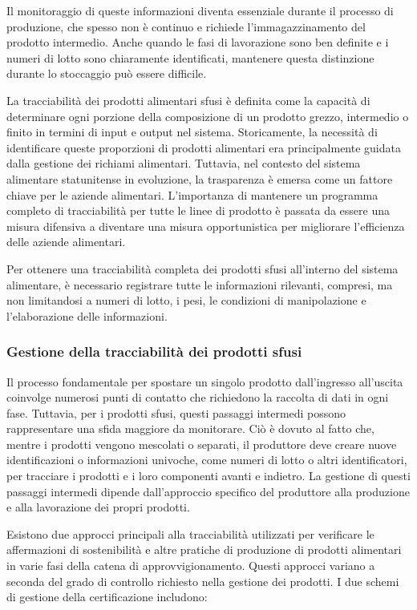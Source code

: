 Il monitoraggio di queste informazioni diventa essenziale durante il processo di produzione, che spesso non è continuo e richiede l'immagazzinamento del prodotto intermedio. Anche quando le fasi di lavorazione sono ben definite e i numeri di lotto sono chiaramente identificati, mantenere questa distinzione durante lo stoccaggio può essere difficile.

La tracciabilità dei prodotti alimentari sfusi è definita come la capacità di determinare ogni porzione della composizione di un prodotto grezzo, intermedio o finito in termini di input e output nel sistema. Storicamente, la necessità di identificare queste proporzioni di prodotti alimentari era principalmente guidata dalla gestione dei richiami alimentari. Tuttavia, nel contesto del sistema alimentare statunitense in evoluzione, la trasparenza è emersa come un fattore chiave per le aziende alimentari. L'importanza di mantenere un programma completo di tracciabilità per tutte le linee di prodotto è passata da essere una misura difensiva a diventare una misura opportunistica per migliorare l'efficienza delle aziende alimentari.

Per ottenere una tracciabilità completa dei prodotti sfusi all'interno del sistema alimentare, è necessario registrare tutte le informazioni rilevanti, compresi, ma non limitandosi a numeri di lotto, i pesi, le condizioni di manipolazione e l'elaborazione delle informazioni.

\subsubsection{Gestione della tracciabilità dei prodotti sfusi}

Il processo fondamentale per spostare un singolo prodotto dall'ingresso all'uscita coinvolge numerosi punti di contatto che richiedono la raccolta di dati in ogni fase. Tuttavia, per i prodotti sfusi, questi passaggi intermedi possono rappresentare una sfida maggiore da monitorare. Ciò è dovuto al fatto che, mentre i prodotti vengono mescolati o separati, il produttore deve creare nuove identificazioni o informazioni univoche, come numeri di lotto o altri identificatori, per tracciare i prodotti e i loro componenti avanti e indietro. La gestione di questi passaggi intermedi dipende dall'approccio specifico del produttore alla produzione e alla lavorazione dei propri prodotti.

Esistono due approcci principali alla tracciabilità utilizzati per verificare le affermazioni di sostenibilità e altre pratiche di produzione di prodotti alimentari in varie fasi della catena di approvvigionamento. Questi approcci variano a seconda del grado di controllo richiesto nella gestione dei prodotti. I due schemi di gestione della certificazione includono:

